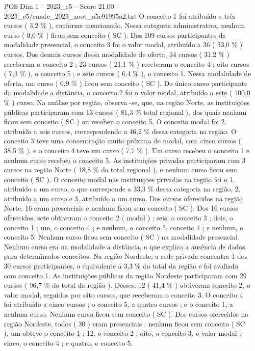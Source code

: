 \begin{textsample}{POS Dim 1 – 2023\_c5 – Score 21.00 – 2023\_c5/enade\_2023\_zoot\_a5e91995a2.txt}
O conceito 1 foi atribuído a três cursos ( 3,2 \% ), conforme mencionado.
Nessa categoria administrativa, nenhum curso ( 0,0 \% ) ficou sem conceito ( SC ).
Dos 109 cursos participantes da modalidade presencial, o conceito 3 foi o valor modal, atribuído a 36 ( 33,0 \% ) cursos.
Dos demais cursos dessa modalidade de oferta, 34 cursos ( 31,2 \% ) receberam o conceito 2 ; 23 cursos ( 21,1 \% ) receberam o conceito 4 ; oito cursos ( 7,3 \% ), o conceito 5 ; e sete cursos ( 6,4 \% ), o conceito 1.
Nessa modalidade de oferta, um curso ( 0,9 \% ) ficou sem conceito ( SC ).
Do único curso participante da modalidade a distância, o conceito 2 foi o valor modal, atribuído a este ( 100,0 \% ) curso.
Na análise por região, observa -se, que, na região Norte, as instituições públicas participaram com 13 cursos ( 81,3 \% total regional ), dos quais nenhum ficou sem conceito ( SC ) ou recebeu o conceito 5.
O conceito modal foi 2, atribuído a seis cursos, correspondendo a 46,2 \% dessa categoria na região.
O conceito 3 teve uma concentração muito próxima do modal, com cinco cursos ( 38,5 \% ), e o conceito 4 teve um curso ( 7,7 \% ).
Um curso recebeu o conceito 1 e nenhum curso recebeu o conceito 5.
As instituições privadas participaram com 3 cursos na região Norte ( 18,8 \% do total regional ), e nenhum curso ficou sem conceito ( SC ).
O conceito modal nas instituições privadas na região foi o 1, atribuído a um curso, o que corresponde a 33,3 \% dessa categoria na região, 2, atribuído a um curso e 3, atribuído a um curso.
Dos cursos oferecidos na região Norte, 16 eram presenciais e nenhum ficou sem conceito ( SC ).
Dos 16 cursos oferecidos, sete obtiveram o conceito 2 ( modal ) ; seis, o conceito 3 ; dois, o conceito 1 ; um, o conceito 4 ; e nenhum, o conceito 5. conceito 4 ; e nenhum, o conceito 5.
Nenhum curso ficou sem conceito ( SC ) na modalidade presencial.
Nenhum curso era na modalidade a distância, o que explica a ausência de dados para determinados conceitos.
Na região Nordeste, a rede privada concentra 1 dos 30 cursos participantes, o equivalente a 3,3 \% do total da região e foi avaliado com conceito 1.
As instituições públicas da região Nordeste participaram com 29 cursos ( 96,7 \% do total da região ).
Desses, 12 ( 41,4 \% ) obtiveram conceito 2, o valor modal, seguidos por oito cursos, que receberam o conceito 3.
O conceito 4 foi atribuído a cinco cursos ; o conceito 5, a quatro cursos ; e o conceito 1, a nenhum curso.
Nenhum curso ficou sem conceito ( SC ).
Dos cursos oferecidos na região Nordeste, todos ( 30 ) eram presenciais : nenhum ficou sem conceito ( SC ), um obteve o conceito 1 ; 12, o conceito 2 ; oito, o conceito 3, o valor modal ; cinco, o conceito 4 ; e quatro, o conceito 5.

\end{textsample}
